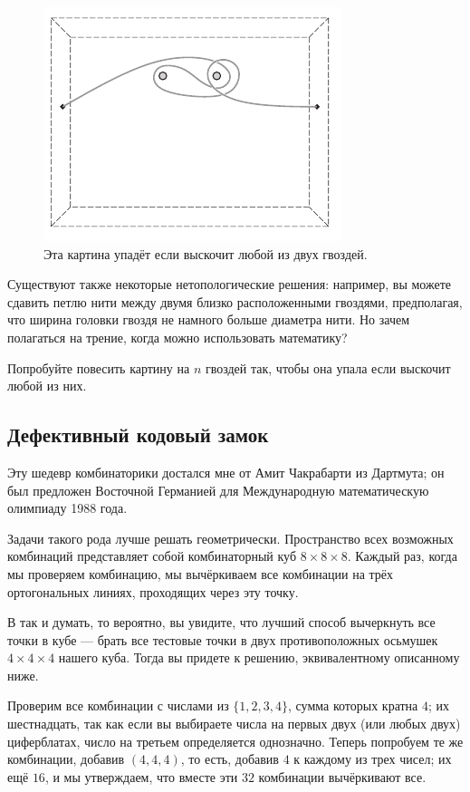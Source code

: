 \begin{figure}[h!]
\centering
\includegraphics[scale=1]{pics/kartina2}
\caption{Эта картина упадёт если выскочит любой из двух гвоздей.}
\end{figure}

Существуют также некоторые нетопологические решения: например, вы можете сдавить петлю нити между двумя близко расположенными гвоздями, предполагая, что ширина головки гвоздя не намного больше диаметра нити.
Но зачем полагаться на трение, когда можно использовать математику?

\begin{addedbytheeditors}
Попробуйте повесить картину на $n$ гвоздей так, чтобы она упала если выскочит любой из них.
\end{addedbytheeditors}

\subsection*{Дефективный кодовый замок}

Эту шедевр комбинаторики достался мне от Амит Чакрабарти из Дартмута;
он был предложен Восточной Германией для Международную математическую олимпиаду 1988 года.

Задачи такого рода лучше решать геометрически.
Пространство всех возможных комбинаций представляет собой комбинаторный куб $8 \times 8 \times 8$.
Каждый раз, когда мы проверяем комбинацию, мы вычёркиваем все комбинации на трёх ортогональных линиях, проходящих через эту точку.

В так и думать, то вероятно, вы увидите, что лучший способ вычеркнуть все точки в кубе --- брать все тестовые точки в двух противоположных осьмушек $4 \times 4 \times 4$ нашего куба.
Тогда вы придете к решению, эквивалентному описанному ниже.

Проверим все комбинации с числами из $\{1, 2, 3, 4\}$, сумма которых кратна $4$; их шестнадцать, так как если вы выбираете числа на первых двух (или любых двух) циферблатах, число на третьем определяется однозначно.
Теперь попробуем те же комбинации, добавив $(4,4,4)$, то есть, добавив $4$ к каждому из трех чисел;
их ещё $16$, и мы утверждаем, что вместе эти $32$ комбинации вычёркивают все.

